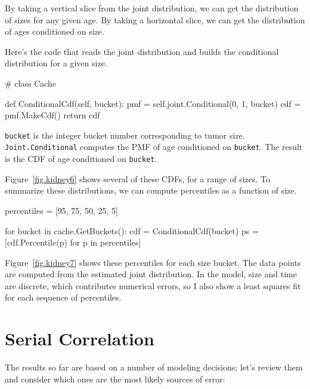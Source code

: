 \documentclass[12pt]{book}
\theoremstyle{exercise}
\newcommand{\py}[1]{{\tt #1}}%
\begin{document}
By taking a vertical slice from the joint distribution, we can get the
distribution of sizes for any given age.  By taking a horizontal
slice, we can get the distribution of ages conditioned on size.

Here's the code that reads the joint distribution and builds
the conditional distribution for a given size.

\begin{code}
# class Cache

    def ConditionalCdf(self, bucket):
        pmf = self.joint.Conditional(0, 1, bucket)
        cdf = pmf.MakeCdf()
        return cdf
\end{code}

\verb"bucket" is the integer bucket number corresponding to
tumor size.  \py{Joint.Conditional} computes the
PMF of age conditioned on \py{bucket}.
The result is the CDF of age conditioned on \py{bucket}.

Figure~\ref{fig.kidney6} shows several of these CDFs, for
a range of sizes.  To summarize these distributions, we can
compute percentiles as a function of size.

\begin{code}
    percentiles = [95, 75, 50, 25, 5]

    for bucket in cache.GetBuckets():
        cdf = ConditionalCdf(bucket)
        ps = [cdf.Percentile(p) for p in percentiles]
\end{code}

Figure~\ref{fig.kidney7} shows these percentiles for each
size bucket.  The data points are computed from the estimated
joint distribution.  In the model, size and time are discrete,
which contributes numerical errors, so I also show a least
squares fit for each sequence of percentiles.


\section{Serial Correlation}
\label{serial}

The results so far are based on a number of modeling decisions;
let's review them and consider which ones are the most
likely sources of error:
\end{document}
